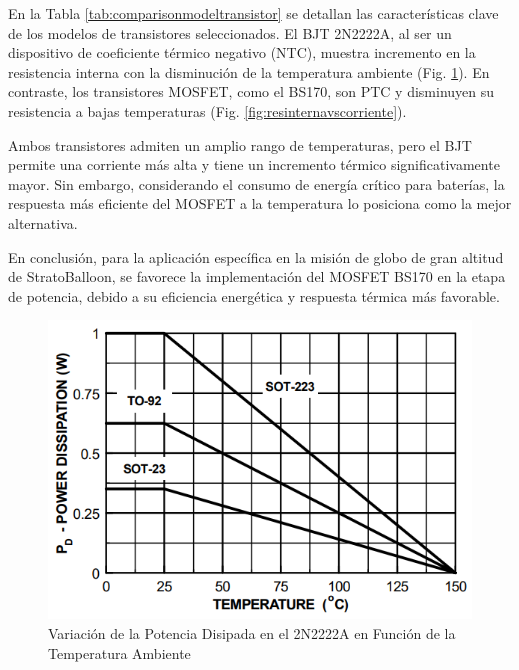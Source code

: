 En la Tabla \ref{tab:comparisonmodeltransistor} se detallan las características clave de los modelos de transistores seleccionados. El BJT 2N2222A, al ser un dispositivo de coeficiente térmico negativo (NTC), muestra incremento en la resistencia interna con la disminución de la temperatura ambiente (Fig. \ref{fig:pdenviromentaltemperature}). En contraste, los transistores MOSFET, como el BS170, son PTC y disminuyen su resistencia a bajas temperaturas (Fig. \ref{fig:resinternavscorriente}).

Ambos transistores admiten un amplio rango de temperaturas, pero el BJT permite una corriente más alta y tiene un incremento térmico significativamente mayor. Sin embargo, considerando el consumo de energía crítico para baterías, la respuesta más eficiente del MOSFET a la temperatura lo posiciona como la mejor alternativa.

En conclusión, para la aplicación específica en la misión de globo de gran altitud de StratoBalloon, se favorece la implementación del MOSFET BS170 en la etapa de potencia, debido a su eficiencia energética y respuesta térmica más favorable.

\newpage

\begin{figure}[h]
  \centering
  \includegraphics[width=0.85\linewidth]{Pictures/2N2222ApowerD.png} 
  \caption{Variación de la Potencia Disipada en el 2N2222A en Función de la Temperatura Ambiente \cite{2N2222A_Datasheet}}
  \label{fig:pdenviromentaltemperature}
\end{figure}

